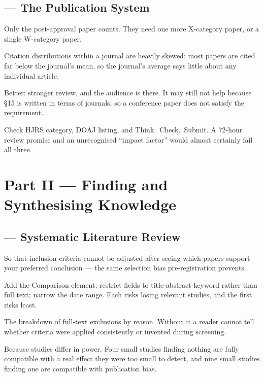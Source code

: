 \subsection*{ --- The Publication System}
\begin{tightnum}
  \item Only the post-approval paper counts. They need one more X-category
    paper, or a single W-category paper.
  \item Citation distributions within a journal are heavily skewed: most papers
    are cited far below the journal's mean, so the journal's average says
    little about any individual article.
  \item Better: stronger review, and the audience is there. It may still not
    help because \S15 is written in terms of journals, so a conference paper
    does not satisfy the requirement.
  \item Check HJRS category, DOAJ listing, and Think.\ Check.\ Submit. A
    72-hour review promise and an unrecognised ``impact factor'' would almost
    certainly fail all three.
\end{tightnum}

\section{Part II --- Finding and Synthesising Knowledge}

\subsection*{ --- Systematic Literature Review}
\begin{tightnum}
  \item So that inclusion criteria cannot be adjusted after seeing which papers
    support your preferred conclusion --- the same selection bias
    pre-registration prevents.
  \item Add the Comparison element; restrict fields to title-abstract-keyword
    rather than full text; narrow the date range. Each risks losing relevant
    studies, and the first risks least.
  \item The breakdown of full-text exclusions by reason. Without it a reader
    cannot tell whether criteria were applied consistently or invented during
    screening.
  \item Because studies differ in power. Four small studies finding nothing are
    fully compatible with a real effect they were too small to detect, and nine
    small studies finding one are compatible with publication bias.
\end{tightnum}

